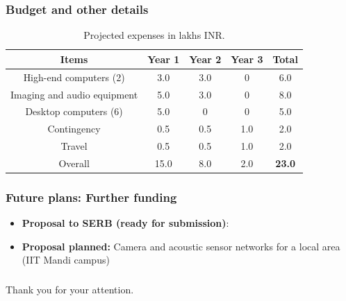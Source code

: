 \documentclass[mathserif]{beamer}
\begin{document}
\begin{frame}
\frametitle{Budget and other details}

\begin{table}[th]
\centering
\caption{Projected expenses in lakhs INR.}
\begin{tabular}{|c|c|c|c|c|}
\hline
Items & Year 1 & Year 2 & Year 3 & Total\\
\hline
High-end computers (2) & 3.0 & 3.0 & 0 & 6.0\\
Imaging and audio equipment & 5.0 & 3.0 & 0 & 8.0 \\
Desktop computers (6) & 5.0 & 0 & 0 & 5.0  \\
Contingency & 0.5 & 0.5 & 1.0 & 2.0 \\
Travel & 0.5 & 0.5 & 1.0 & 2.0\\
\hline
Overall & 15.0 & 8.0 & 2.0 & \textbf{23.0} \\
\hline
\end{tabular}
\label{tab:funding}
\end{table}
\end{frame}


\begin{frame}
\frametitle{Future plans: Further funding}
\begin{itemize}
\item \textbf{Proposal to SERB (ready for submission)}:
\item \textbf{Proposal planned:} Camera and acoustic sensor networks for a local area (IIT Mandi campus)
\end{itemize}
\end{frame}


\begin{frame}
\frametitle{}
\Large{Thank you for your attention.}
\end{frame}
\end{document}

